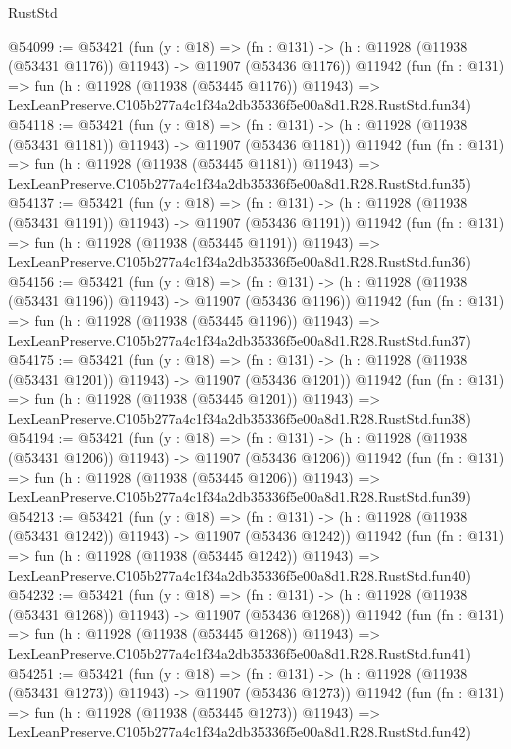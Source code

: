 \begin{lexlean}{RustStd}
\begin{coremodule}
@54099 := @53421
    (fun (y : @18) =>
    (fn : @131) -> (h : @11928 (@11938 (@53431 @1176)) @11943) -> @11907 (@53436 @1176))
    @11942
    (fun (fn : @131) =>
    fun (h : @11928 (@11938 (@53445 @1176)) @11943) =>
    LexLeanPreserve.C105b277a4c1f34a2db35336f5e00a8d1.R28.RustStd.fun34)
@54118 := @53421
    (fun (y : @18) =>
    (fn : @131) -> (h : @11928 (@11938 (@53431 @1181)) @11943) -> @11907 (@53436 @1181))
    @11942
    (fun (fn : @131) =>
    fun (h : @11928 (@11938 (@53445 @1181)) @11943) =>
    LexLeanPreserve.C105b277a4c1f34a2db35336f5e00a8d1.R28.RustStd.fun35)
@54137 := @53421
    (fun (y : @18) =>
    (fn : @131) -> (h : @11928 (@11938 (@53431 @1191)) @11943) -> @11907 (@53436 @1191))
    @11942
    (fun (fn : @131) =>
    fun (h : @11928 (@11938 (@53445 @1191)) @11943) =>
    LexLeanPreserve.C105b277a4c1f34a2db35336f5e00a8d1.R28.RustStd.fun36)
@54156 := @53421
    (fun (y : @18) =>
    (fn : @131) -> (h : @11928 (@11938 (@53431 @1196)) @11943) -> @11907 (@53436 @1196))
    @11942
    (fun (fn : @131) =>
    fun (h : @11928 (@11938 (@53445 @1196)) @11943) =>
    LexLeanPreserve.C105b277a4c1f34a2db35336f5e00a8d1.R28.RustStd.fun37)
@54175 := @53421
    (fun (y : @18) =>
    (fn : @131) -> (h : @11928 (@11938 (@53431 @1201)) @11943) -> @11907 (@53436 @1201))
    @11942
    (fun (fn : @131) =>
    fun (h : @11928 (@11938 (@53445 @1201)) @11943) =>
    LexLeanPreserve.C105b277a4c1f34a2db35336f5e00a8d1.R28.RustStd.fun38)
@54194 := @53421
    (fun (y : @18) =>
    (fn : @131) -> (h : @11928 (@11938 (@53431 @1206)) @11943) -> @11907 (@53436 @1206))
    @11942
    (fun (fn : @131) =>
    fun (h : @11928 (@11938 (@53445 @1206)) @11943) =>
    LexLeanPreserve.C105b277a4c1f34a2db35336f5e00a8d1.R28.RustStd.fun39)
@54213 := @53421
    (fun (y : @18) =>
    (fn : @131) -> (h : @11928 (@11938 (@53431 @1242)) @11943) -> @11907 (@53436 @1242))
    @11942
    (fun (fn : @131) =>
    fun (h : @11928 (@11938 (@53445 @1242)) @11943) =>
    LexLeanPreserve.C105b277a4c1f34a2db35336f5e00a8d1.R28.RustStd.fun40)
@54232 := @53421
    (fun (y : @18) =>
    (fn : @131) -> (h : @11928 (@11938 (@53431 @1268)) @11943) -> @11907 (@53436 @1268))
    @11942
    (fun (fn : @131) =>
    fun (h : @11928 (@11938 (@53445 @1268)) @11943) =>
    LexLeanPreserve.C105b277a4c1f34a2db35336f5e00a8d1.R28.RustStd.fun41)
@54251 := @53421
    (fun (y : @18) =>
    (fn : @131) -> (h : @11928 (@11938 (@53431 @1273)) @11943) -> @11907 (@53436 @1273))
    @11942
    (fun (fn : @131) =>
    fun (h : @11928 (@11938 (@53445 @1273)) @11943) =>
    LexLeanPreserve.C105b277a4c1f34a2db35336f5e00a8d1.R28.RustStd.fun42)

\end{coremodule}
\end{lexlean}
